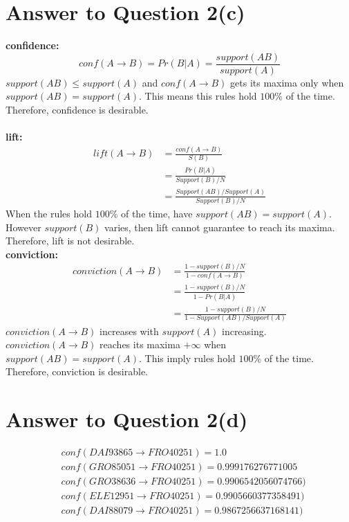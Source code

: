 \documentclass[11pt]{article}
\begin{document}
\pagebreak[4]
\section*{Answer to Question 2(c)}
\textbf{confidence: }\\
\begin{equation}
    conf(A\rightarrow B) = Pr(B|A) = \frac{support(AB)}{support(A)}
\end{equation}
$support(AB) \leq support(A)$ and $conf(A\rightarrow B)$ gets its maxima only when $support(AB) = support(A)$.
This means this rules hold $100\%$ of the time. Therefore, confidence is desirable.\\
\\
\textbf{lift: }
\begin{equation}
\begin{aligned}
    lift(A\rightarrow B) & = \frac{conf(A\rightarrow B)}{S(B)}\\
    & = \frac{Pr(B|A)}{Support(B)/N}\\
    & = \frac{Support(AB)/Support(A)}{Support(B)/N}
\end{aligned}
\end{equation}
When the rules hold $100\%$ of the time, have $support(AB) = support(A)$.
However $support(B)$ varies, then lift cannot guarantee to reach its maxima.
Therefore, lift is not desirable.
\\
\textbf{conviction: }
\begin{equation}
\begin{aligned}
    conviction(A\rightarrow B) & = \frac{1 - support(B)/N}{1 - conf(A\rightarrow B)}\\
    & = \frac{1 - support(B)/N}{1 - Pr(B|A)}\\
    & = \frac{1 - support(B)/N}{1 - Support(AB)/Support(A)}
\end{aligned}
\end{equation}
$conviction(A\rightarrow B)$ increases with $support(A)$ increasing.
$conviction(A\rightarrow B)$ reaches its maxima $+\infty$ when $support(AB) = support(A)$. This imply rules hold $100\%$ of the time.
Therefore, conviction is desirable.

\pagebreak[4]
\section*{Answer to Question 2(d)}
\begin{equation*}
\begin{aligned}
& conf(DAI93865\rightarrow FRO40251) = 1.0\\
& conf(GRO85051\rightarrow FRO40251) = 0.999176276771005\\
& conf(GRO38636\rightarrow FRO40251) = 0.9906542056074766)\\
& conf(ELE12951\rightarrow FRO40251) = 0.9905660377358491)\\
& conf(DAI88079\rightarrow FRO40251) = 0.9867256637168141)
\end{aligned}
\end{equation*}
\end{document}
